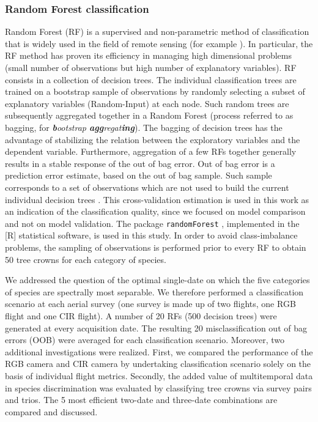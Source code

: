 \documentclass[remotesensing,article,submit,moreauthors,pdftex,12pt,a4paper]{mdpi} %
\begin{document}
\subsubsection{Random Forest classification}

Random Forest (RF) is a supervised and non-parametric method of classification that is widely used in the field of remote sensing (for example \cite{stumpf_object-oriented_2011,burkholder_seasonal_2011,immitzer_tree_2012, zhu_continuous_2014}). 
In particular, the RF method has proven its efficiency in managing high dimensional problems \cite{genuer_variable_2010} (small number of observations but high number of explanatory variables). 
RF consists in a collection of decision trees. 
The individual classification trees are trained on a bootstrap sample of observations by randomly selecting a subset of explanatory variables (Random-Input) at each node. 
Such random trees are subsequently aggregated together in a Random Forest (process referred to as bagging, for \textit{\textbf{b}ootstrap \textbf{agg}regat\textbf{ing}}). 
The bagging of decision trees has the advantage of stabilizing the relation between the exploratory variables and the dependent variable. 
Furthermore, aggregation of a few RFs together generally results in a stable response of the out of bag error. 
Out of bag error is a prediction error estimate, based on the out of bag sample. Such sample corresponds to a set of observations which are not used to build the current individual decision trees \cite{genuer_variable_2010}. 
This cross-validation estimation is used in this work as an indication of the classification quality, since we focused on model comparison and not on model validation. 
The package {\tt randomForest} \cite{liaw_classification_2002}, implemented in the [R] statistical software, is used in this study. 
In order to avoid class-imbalance problems, the sampling of observations is performed prior to every RF to obtain 50 tree crowns for each category of species. 

We addressed the question of the optimal single-date on which the five categories of species are spectrally most separable. 
We therefore performed a classification scenario at each aerial survey (one survey is made up of two flights, one RGB flight and one CIR flight). 
A number of 20 RFs (500 decision trees) were generated at every acquisition date.
The resulting 20 misclassification out of bag errors (OOB) were averaged for each classification scenario. 
Moreover, two additional investigations were realized. 
First, we compared the performance of the RGB camera and CIR camera by undertaking classification scenario solely on the basis of individual flight metrics. 
Secondly, the added value of multitemporal data in species discrimination was evaluated by classifying tree crowns via survey pairs and trios.
The 5 most efficient two-date and three-date combinations are compared and discussed.
\end{document}
